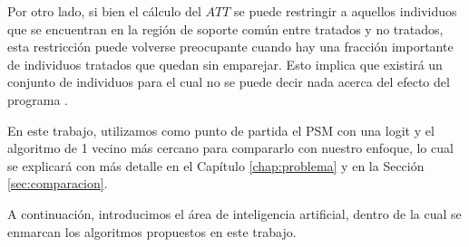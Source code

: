 \documentclass[../../main.tex]{subfiles}
\begin{document}
Por otro lado, si bien el cálculo del \(ATT\) se puede restringir a aquellos individuos
que se encuentran en la región de soporte común entre tratados y no tratados, esta
restricción puede volverse preocupante cuando hay una fracción importante de individuos
tratados que quedan sin emparejar. Esto implica que existirá un conjunto de individuos
para el cual no se puede decir nada acerca del efecto del programa \cite{bernal}.

\bigskip
En este trabajo, utilizamos como punto de partida el PSM con una logit y el algoritmo de 1
vecino más cercano para compararlo con nuestro enfoque, lo cual se explicará con más
detalle en el Capítulo \ref{chap:problema} y en la Sección \ref{sec:comparacion}.

A continuación, introducimos el área de inteligencia artificial, dentro de la cual se
enmarcan los algoritmos propuestos en este trabajo.
\end{document}
